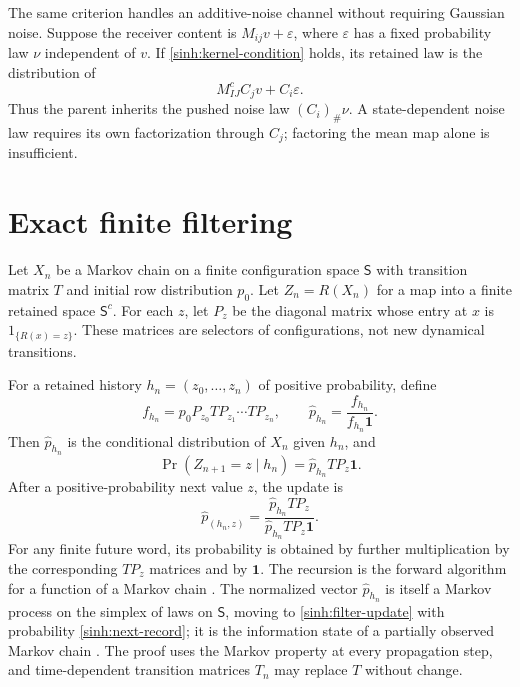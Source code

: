 The same criterion handles an additive-noise channel without requiring
Gaussian noise. Suppose the receiver content is $M_{ij}v+\varepsilon$,
where $\varepsilon$ has a fixed probability law $\nu$ independent of
$v$. If \cref{sinh:kernel-condition} holds, its retained law is the
distribution of
\begin{equation}
 M_{IJ}^c C_jv+C_i\varepsilon.
\end{equation}
Thus the parent inherits the pushed noise law $(C_i)_\#\nu$. A
state-dependent noise law requires its own factorization through $C_j$;
factoring the mean map alone is insufficient.

\section{Exact finite filtering}

Let $X_n$ be a Markov chain on a finite configuration space $\mathsf S$
with transition matrix $T$ and initial row distribution $p_0$. Let
$Z_n=R(X_n)$ for a map into a finite retained space $\mathsf S^c$.
For each $z$, let $P_z$ be the diagonal matrix whose entry at $x$ is
$1_{\{R(x)=z\}}$. These matrices are selectors of configurations, not
new dynamical transitions.

For a retained history $h_n=(z_0,\ldots,z_n)$ of positive probability,
define
\begin{equation}
 f_{h_n}=p_0P_{z_0}TP_{z_1}\cdots TP_{z_n},\qquad
 \widehat p_{h_n}=\frac{f_{h_n}}{f_{h_n}\mathbf 1}.
 \label{sinh:filter-law}
\end{equation}
Then $\widehat p_{h_n}$ is the conditional distribution of $X_n$ given
$h_n$, and
\begin{equation}
 \Pr(Z_{n+1}=z\mid h_n)=\widehat p_{h_n}TP_z\mathbf 1.
 \label{sinh:next-record}
\end{equation}
After a positive-probability next value $z$, the update is
\begin{equation}
 \widehat p_{(h_n,z)}
 =\frac{\widehat p_{h_n}TP_z}
        {\widehat p_{h_n}TP_z\mathbf 1}.
 \label{sinh:filter-update}
\end{equation}
For any finite future word, its probability is obtained by further
multiplication by the corresponding $TP_z$ matrices and by $\mathbf 1$.
The recursion is the forward algorithm for a function of a Markov chain
\citep{BaumPetrie1966,EphraimMerhav2002}. The normalized vector
$\widehat p_{h_n}$ is itself a Markov process on the simplex of laws on
$\mathsf S$, moving to \cref{sinh:filter-update} with probability
\cref{sinh:next-record}; it is the information state of a partially
observed Markov chain \citep{Astrom1965}. The proof uses the Markov
property at every propagation step, and time-dependent transition matrices
$T_n$ may replace $T$ without change.


